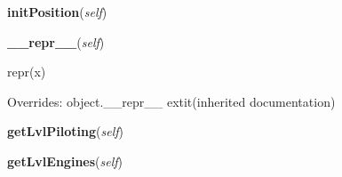    \label{crewMember:CrewMember:initPosition}

    \vspace{0.5ex}

\hspace{.8\funcindent}\begin{boxedminipage}{\funcwidth}

    \raggedright \textbf{initPosition}(\textit{self})

\setlength{\parskip}{2ex}
\setlength{\parskip}{1ex}
    \end{boxedminipage}

    \vspace{0.5ex}

\hspace{.8\funcindent}\begin{boxedminipage}{\funcwidth}

    \raggedright \textbf{\_\_repr\_\_}(\textit{self})

\setlength{\parskip}{2ex}
    repr(x)

\setlength{\parskip}{1ex}
      Overrides: object.\_\_repr\_\_ 	extit{(inherited documentation)}

    \end{boxedminipage}

    \label{crewMember:CrewMember:getLvlPiloting}

    \vspace{0.5ex}

\hspace{.8\funcindent}\begin{boxedminipage}{\funcwidth}

    \raggedright \textbf{getLvlPiloting}(\textit{self})

\setlength{\parskip}{2ex}
\setlength{\parskip}{1ex}
    \end{boxedminipage}

    \label{crewMember:CrewMember:getLvlEngines}

    \vspace{0.5ex}

\hspace{.8\funcindent}\begin{boxedminipage}{\funcwidth}

    \raggedright \textbf{getLvlEngines}(\textit{self})

\setlength{\parskip}{2ex}
\setlength{\parskip}{1ex}
    \end{boxedminipage}

